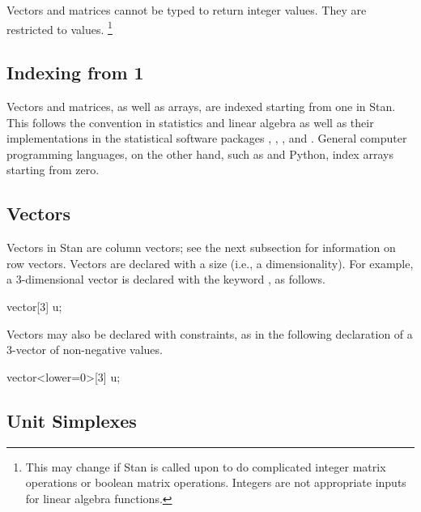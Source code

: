 Vectors and matrices cannot be typed to return integer values.  They
are restricted to  values.%
%
\footnote{This may change if Stan is called upon to do complicated
  integer matrix operations or boolean matrix operations.  Integers
  are not appropriate inputs for linear algebra functions.}




\subsection{Indexing from 1}

Vectors and matrices, as well as arrays, are indexed starting from one
in Stan.  This follows the convention in statistics and linear
algebra as well as their implementations in the statistical software
packages \R, \MATLAB, \BUGS, and \JAGS.  General computer programming
languages, on the other hand, such as \Cpp and Python, index arrays
starting from zero.

\subsection{Vectors}

Vectors in Stan are column vectors; see the next subsection for
information on row vectors.  Vectors are declared with a size (i.e., a
dimensionality).  For example, a 3-dimensional vector is declared with
the keyword , as follows.
%
\begin{stancode}
vector[3] u;
\end{stancode}
%
Vectors may also be declared with constraints, as in the following
declaration of a 3-vector of non-negative values.
%
\begin{stancode}
vector<lower=0>[3] u;
\end{stancode}
%

\subsection{Unit Simplexes}

